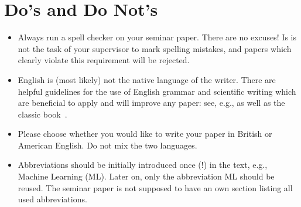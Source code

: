 \section{Do's and Do Not's}

\begin{itemize}
    \item Always run a spell checker on your seminar paper. There are no excuses! Is is not the task
      of your supervisor to mark spelling mistakes, and papers which clearly violate this
      requirement will be rejected.
    \item English is (most likely) not the native language of the writer. There are helpful
      guidelines for the use of English grammar and scientific writing which are beneficial to apply
      and will improve any paper: see, e.g., \cite{IEEEstyleguide, Gol06} as well as the
      classic book~\cite{Stu12}.
    \item Please choose whether you would like to write your paper in British or American English.
      Do not mix the two languages.    
    \item Abbreviations should be initially introduced once (!) in the text, e.g., Machine Learning
      (ML). Later on, only the abbreviation ML should be reused. The seminar paper is not supposed
      to have an own section listing all used abbreviations.
\end{itemize}

